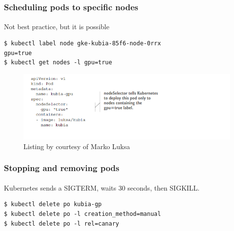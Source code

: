 \begin{frame}[fragile]
	\frametitle{Scheduling pods to specific nodes}
	\framesubtitle{}
	Not best practice, but it is possible
	\begin{lstlisting}[numbers=none, basicstyle=\ttfamily]
$ kubectl label node gke-kubia-85f6-node-0rrx
gpu=true
$ kubectl get nodes -l gpu=true
	\end{lstlisting}
	\begin{figure}[htbp!]
		\includegraphics[width=1\textwidth]{listings/3_4.png}
		\caption{Listing by courtesy of Marko Luksa\cite{Luksa2018}}
		\label{fig:}
	\end{figure}
\end{frame}

\begin{frame}[fragile]
	\frametitle{Stopping and removing pods}
	\framesubtitle{}
	Kubernetes sends a SIGTERM, waits 30 seconds, then SIGKILL.
	\begin{lstlisting}[numbers=none, basicstyle=\ttfamily]
$ kubectl delete po kubia-gp
$ kubectl delete po -l creation_method=manual
$ kubectl delete po -l rel=canary
	\end{lstlisting}
\end{frame}


